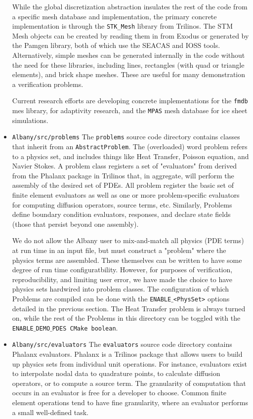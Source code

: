 \documentclass[pdf,12pt,report,strict]{SANDreport}
\theoremstyle{remark}
\begin{document}
\begin{itemize}
While the global discretization abstraction insulates the rest of the code from a
specific mesh database and implementation, the primary concrete implementation
is through the \texttt{STK\_Mesh} library from Trilinos. The STM Mesh objects can be
created by reading them in from Exodus or generated by the Pamgen library, both of
which use the SEACAS and IOSS tools. Alternatively, simple meshes can be generated
internally in the code without the need for these libraries, including lines, 
rectangles (with quad or triangle elements), and brick shape meshes. These are useful
for many demonstration a verification problems.

Current research efforts are developing concrete implementations for the \texttt{fmdb} 
mes library, for adaptivity research, and the \texttt{MPAS} mesh database for 
ice sheet simulations.

\item{\texttt{Albany/src/problems}}  The \texttt{problems} source code directory contains
classes that inherit from an \texttt{AbstractProblem}. The (overloaded) word problem 
refers to a physics set, and includes things like Heat Transfer, Poisson equation, and
Navier Stokes. A problem class registers a set of "evaluators" from derived from the
Phalanx package in Trilinos that, in aggregate, will perform the assembly of the desired
set of PDEs. All problem register the basic set of finite element evaluators as well as
one or more problem-specific evaluators for computing diffusion operators, source terms,
etc. Similarly, Problems define boundary condition evaluators, responses, and declare
state fields (those that persist beyond one assembly). 

We do not allow the Albany user to mix-and-match all physics (PDE terms)
at run time in an input file, but must construct a "problem" where the physics terms
are assembled. These themselves can be written to have some degree of run time configuratbility.
However, for purposes of verification, reproducibility, and limiting user error, we 
have made the choice to have physics sets hardwired into problem classes.
The configuration of which Problems are compiled can be done with the \texttt{ENABLE$\_$<PhysSet>}
options detailed in the previous section. The Heat Transfer problem is always
turned on, while the rest of the Problems in this directory can be toggled with
the \texttt{ENABLE$\_$DEMO$\_$PDES CMake boolean}.

\item{\texttt{Albany/src/evaluators}}  The \texttt{evaluators} source code directory contains
Phalanx evaluators. Phalanx is a Trilinos package that allows users to build up physics
sets from individual unit operations. For instance, evaluators exist to interpolate
nodal data to quadrature points, to calculate diffusion operators, or to compute a
source term. The granularity of computation that occurs in an evaluator is 
free for a developer to choose. Common finite element operations tend to have fine
granularity, where an evaluator performs a small well-defined task.


\end{itemize}
\end{document}
